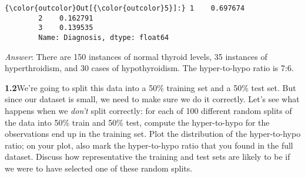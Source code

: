 \documentclass[11pt]{article}
\begin{document}
\begin{Verbatim}[commandchars=\\\{\}]
{\color{outcolor}Out[{\color{outcolor}5}]:} 1    0.697674
        2    0.162791
        3    0.139535
        Name: Diagnosis, dtype: float64
\end{Verbatim}
            
    \emph{Answer}: There are 150 instances of normal thyroid levels, 35
instances of hyperthroidism, and 30 cases of hypothyroidism. The
hyper-to-hypo ratio is 7:6.

    \textbf{1.2}We're going to split this data into a 50\% training set and
a 50\% test set. But since our dataset is small, we need to make sure we
do it correctly. Let's see what happens when we \emph{don't} split
correctly: for each of 100 different random splits of the data into 50\%
train and 50\% test, compute the hyper-to-hypo for the observations end
up in the training set. Plot the distribution of the hyper-to-hypo
ratio; on your plot, also mark the hyper-to-hypo ratio that you found in
the full dataset. Discuss how representative the training and test sets
are likely to be if we were to have selected one of these random splits.
\end{document}
